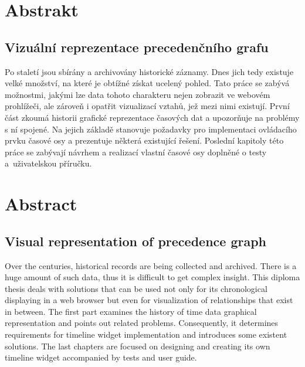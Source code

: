 \chapter*{Abstrakt}     %
\thispagestyle{empty}   %
	\section*{Vizuální reprezentace precedenčního grafu}
		Po staletí jsou sbírány a archivovány historické záznamy. Dnes jich tedy existuje velké množství, na které je obtížné získat ucelený pohled. Tato práce se zabývá možnostmi, jakými lze data tohoto charakteru nejen zobrazit ve webovém prohlížeči, ale zároveň i opatřit vizualizací vztahů, jež mezi nimi existují. První část zkoumá historii grafické reprezentace časových dat a upozorňuje na problémy s ní spojené. Na jejich základě stanovuje požadavky pro implementaci ovládacího prvku časové osy a prezentuje některá existující řešení. Poslední kapitoly této práce se zabývají návrhem a realizací vlastní časové osy doplněné o testy a~uživatel\-skou příručku.

\chapter*{Abstract}     %
\thispagestyle{empty}   %
	\section*{Visual representation of precedence graph}
		Over the centuries, historical records are being collected and archived. There is a huge amount of such data, thus it is difficult to get complex insight. This diploma thesis deals with solutions that can be used not only for its chronological displaying in a web browser but even for visualization of relationships that exist in between. The first part examines the history of time data graphical representation and points out related problems. Consequently, it determines requirements for timeline widget implementation and introduces some existent solutions. The last chapters are focused on designing and creating its own timeline widget accompanied by tests and user guide.
